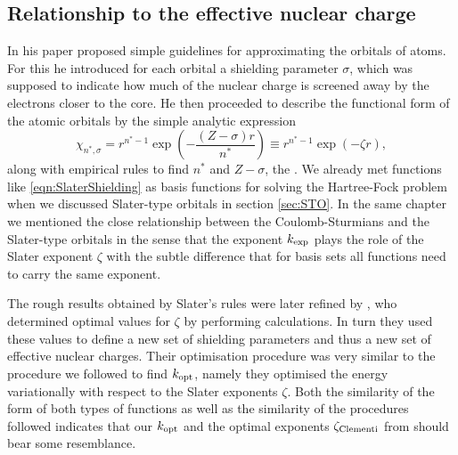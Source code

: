 %
%
\subsection{Relationship to the effective nuclear charge}
\label{sec:ValuesKopt}

In his \citeyear{Slater1930} paper \citet{Slater1930} proposed simple guidelines
for approximating the orbitals of atoms.
For this he introduced for each orbital a shielding parameter $\sigma$,
which was supposed to indicate how much of the nuclear charge is screened
away by the electrons closer to the core.
He then proceeded to describe the functional
form of the atomic orbitals by the simple analytic expression
\begin{equation}
	\chi_{n^\ast, \sigma} = r^{n^\ast - 1} \exp\left( - \frac{(Z - \sigma)r}{n^\ast} \right)
	\equiv r^{n^\ast - 1} \exp\left( -\zeta r\right),
	\label{eqn:SlaterShielding}
\end{equation}
along with empirical rules to find $n^\ast$ and $Z - \sigma$,
the .
We already met functions like \eqref{eqn:SlaterShielding}
as basis functions for solving the Hartree-Fock problem
when we discussed Slater-type orbitals in section \vref{sec:STO}.
In the same chapter we mentioned the close relationship between
the Coulomb-Sturmians and the Slater-type orbitals
in the sense that the \CS exponent $k_\text{exp}$
plays the role of the Slater exponent $\zeta$
with the subtle difference that for \CS basis sets all functions
need to carry the same exponent.

\newcommand{\zCl}{\ensuremath \zeta_\text{Clementi}}
The rough results obtained by Slater's rules
were later refined by \citet{Clementi1963},
who determined optimal values for $\zeta$ by performing \HF calculations.
In turn they used these values to define a new set of shielding parameters
and thus a new set of effective nuclear charges.
Their optimisation procedure was very similar to the procedure
we followed to find $k_\text{opt}$,
namely they optimised the energy variationally with respect to the
Slater exponents $\zeta$.
Both the similarity of the form of both types
of functions as well as the similarity of the procedures followed
indicates that our $k_\text{opt}$ and the optimal exponents $\zCl$ from
\citeauthor{Clementi1963} should bear some resemblance.

